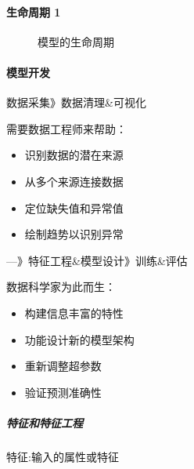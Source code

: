 \documentclass[letterpaper,10pt,english]{sphinxmanual}
\begin{document}
\paragraph{生命周期 1\sphinxfootnotemark[807]}
\label{\detokenize{chapter_project/Model Process:id3}}%
\begin{footnotetext}[807]\sphinxAtStartFootnote
{}
%
\end{footnotetext}\ignorespaces 
\begin{figure}[H]
\centering
\capstart

\noindent{}
\caption{模型的生命周期}\label{\detokenize{chapter_project/Model Process:id12}}\end{figure}


\paragraph{模型开发}
\label{\detokenize{chapter_project/Model Process:id4}}
数据采集\sphinxhyphen{}》数据清理\&可视化

需要数据工程师来帮助：
\begin{itemize}
\item {} 
识别数据的潜在来源

\item {} 
从多个来源连接数据

\item {} 
定位缺失值和异常值

\item {} 
绘制趋势以识别异常

\end{itemize}

—》特征工程\&模型设计\sphinxhyphen{}》训练\&评估

数据科学家为此而生：
\begin{itemize}
\item {} 
构建信息丰富的特性

\item {} 
功能设计新的模型架构

\item {} 
重新调整超参数

\item {} 
验证预测准确性

\end{itemize}


\subparagraph{特征和特征工程}
\label{\detokenize{chapter_project/Model Process:id5}}
特征:输入的属性或特征
\end{document}
